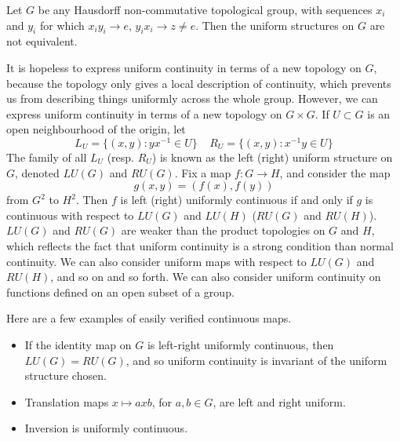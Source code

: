 \begin{example}
    Let $G$ be any Hausdorff non-commutative topological group, with sequences $x_i$ and $y_i$ for which $x_i y_i \to e$, $y_i x_i \to z \neq e$. Then the uniform structures on $G$ are not equivalent.
\end{example}

It is hopeless to express uniform continuity in terms of a new topology on $G$, because the topology only gives a local description of continuity, which prevents us from describing things uniformly across the whole group. However, we can express uniform continuity in terms of a new topology on $G \times G$. If $U \subset G$ is an open neighbourhood of the origin, let
%
\[ L_U = \{ (x,y): yx^{-1} \in U \}\ \ \ \ \ R_U = \{ (x,y): x^{-1}y \in U \} \]
%
The family of all $L_U$ (resp. $R_U$) is known as the left (right) uniform structure on $G$, denoted $LU(G)$ and $RU(G)$. Fix a map $f: G \to H$, and consider the map
%
\[ g(x,y) = (f(x), f(y)) \]
%
from $G^2$ to $H^2$. Then $f$ is left (right) uniformly continuous if and only if $g$ is continuous with respect to $LU(G)$ and $LU(H)$ ($RU(G)$ and $RU(H)$). $LU(G)$ and $RU(G)$ are weaker than the product topologies on $G$ and $H$, which reflects the fact that uniform continuity is a strong condition than normal continuity. We can also consider uniform maps with respect to $LU(G)$ and $RU(H)$, and so on and so forth. We can also consider uniform continuity on functions defined on an open subset of a group.

\begin{example}
    Here are a few examples of easily verified continuous maps.
    \begin{itemize}
        \item If the identity map on $G$ is left-right uniformly continuous, then $LU(G) = RU(G)$, and so uniform continuity is invariant of the uniform structure chosen.
        \item Translation maps $x \mapsto axb$, for $a,b \in G$, are left and right uniform.
        \item Inversion is uniformly continuous.
    \end{itemize}
\end{example}

